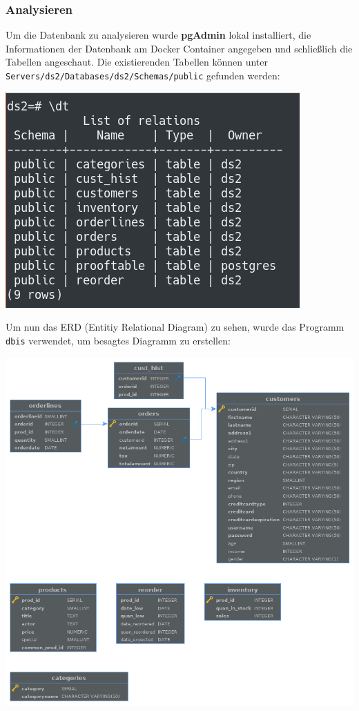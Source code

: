 \subsubsection{Analysieren}
Um die Datenbank zu analysieren wurde \textbf{pgAdmin} lokal installiert, die Informationen der Datenbank am Docker Container angegeben und schließlich die Tabellen angeschaut. Die existierenden Tabellen können unter \verb|Servers/ds2/Databases/ds2/Schemas/public| gefunden werden:

\begin{minipage}{\linewidth}
	\centering
	\includegraphics[width=0.8\linewidth]{images/table1}
\end{minipage}	

Um nun das ERD (Entitiy Relational Diagram) zu sehen, wurde das Programm \verb|dbis| verwendet, um besagtes Diagramm zu erstellen:

\begin{minipage}{\linewidth}
	\centering
	\includegraphics[width=1\linewidth]{images/tablevis}
\end{minipage}

